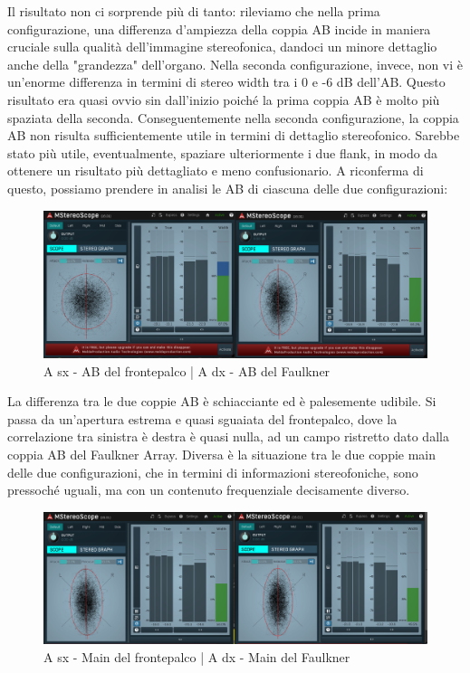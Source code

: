 \documentclass{article}
\begin{document}
    Il risultato non ci sorprende più di tanto: rileviamo che nella prima configurazione, una differenza d'ampiezza della coppia AB incide in maniera cruciale sulla qualità dell'immagine stereofonica, dandoci un minore dettaglio anche della "grandezza" dell'organo. Nella seconda configurazione, invece, non vi è un'enorme differenza in termini di stereo width tra i 0 e -6 dB dell'AB. Questo risultato era quasi ovvio sin dall'inizio poiché la prima coppia AB è molto più spaziata della seconda. Conseguentemente nella seconda configurazione, la coppia AB non risulta sufficientemente utile in termini di dettaglio stereofonico. Sarebbe stato più utile, eventualmente, spaziare ulteriormente i due flank, in modo da ottenere un risultato più dettagliato e meno confusionario.
    A riconferma di questo, possiamo prendere in analisi le AB di ciascuna delle due configurazioni:
    
    \begin{figure}[H]
        \centering
        \includegraphics[width=1\textwidth]{images/4PLOT-AB.png}
         \caption{\label{fig11}A sx - AB del frontepalco | A dx - AB del Faulkner}
    \end{figure}
    
    La differenza tra le due coppie AB è schiacciante ed è palesemente udibile. Si passa da un'apertura estrema e quasi sguaiata del frontepalco, dove la correlazione tra sinistra è destra è quasi nulla, ad un campo ristretto dato dalla coppia AB del Faulkner Array.
    Diversa è la situazione tra le due coppie main delle due configurazioni, che in termini di informazioni stereofoniche, sono pressoché uguali, ma con un contenuto frequenziale decisamente diverso.
    
    \begin{figure}[H]
        \centering
        \includegraphics[width=1\textwidth]{images/4PLOT-MAIN.png}
         \caption{\label{fig11}A sx - Main del frontepalco | A dx - Main del Faulkner}
    \end{figure}
\end{document}
